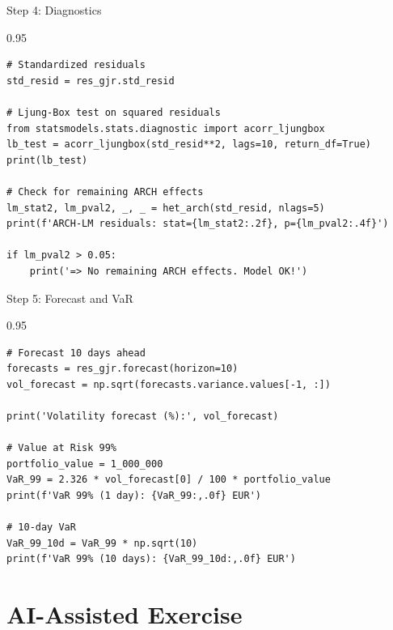 \documentclass[9pt, aspectratio=169, t]{beamer}
\begin{document}
\begin{frame}[fragile]{Step 4: Diagnostics}
    \begin{cminipage}{0.95\textwidth}
\begin{verbatim}
# Standardized residuals
std_resid = res_gjr.std_resid

# Ljung-Box test on squared residuals
from statsmodels.stats.diagnostic import acorr_ljungbox
lb_test = acorr_ljungbox(std_resid**2, lags=10, return_df=True)
print(lb_test)

# Check for remaining ARCH effects
lm_stat2, lm_pval2, _, _ = het_arch(std_resid, nlags=5)
print(f'ARCH-LM residuals: stat={lm_stat2:.2f}, p={lm_pval2:.4f}')

if lm_pval2 > 0.05:
    print('=> No remaining ARCH effects. Model OK!')
\end{verbatim}
    \end{cminipage}
\end{frame}

\begin{frame}[fragile]{Step 5: Forecast and VaR}
    \begin{cminipage}{0.95\textwidth}
\begin{verbatim}
# Forecast 10 days ahead
forecasts = res_gjr.forecast(horizon=10)
vol_forecast = np.sqrt(forecasts.variance.values[-1, :])

print('Volatility forecast (%):', vol_forecast)

# Value at Risk 99%
portfolio_value = 1_000_000
VaR_99 = 2.326 * vol_forecast[0] / 100 * portfolio_value
print(f'VaR 99% (1 day): {VaR_99:,.0f} EUR')

# 10-day VaR
VaR_99_10d = VaR_99 * np.sqrt(10)
print(f'VaR 99% (10 days): {VaR_99_10d:,.0f} EUR')
\end{verbatim}
    \end{cminipage}
\end{frame}

\section{AI-Assisted Exercise}
\end{document}
